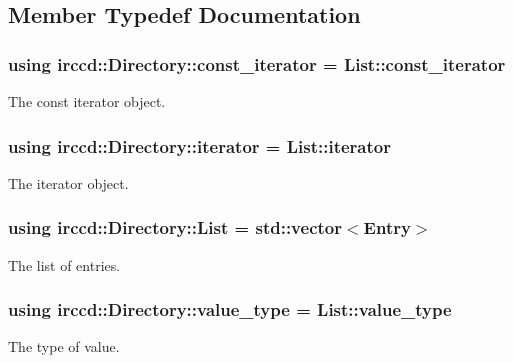 \subsection{Member Typedef Documentation}
\hypertarget{a00025_a191500fda5dd33a3ec8fee40abe7b0cd}{
\subsubsection[{const\-\_\-iterator}]{\setlength{\rightskip}{0pt plus 5cm}using {\bf irccd\-::\-Directory\-::const\-\_\-iterator} =  List\-::const\-\_\-iterator}}\label{a00025_a191500fda5dd33a3ec8fee40abe7b0cd}
The const iterator object. \hypertarget{a00025_a6749daedacaff39269675e482a067167}{
\subsubsection[{iterator}]{\setlength{\rightskip}{0pt plus 5cm}using {\bf irccd\-::\-Directory\-::iterator} =  List\-::iterator}}\label{a00025_a6749daedacaff39269675e482a067167}
The iterator object. \hypertarget{a00025_a375d63db514c30cf26eac6d664525604}{
\subsubsection[{List}]{\setlength{\rightskip}{0pt plus 5cm}using {\bf irccd\-::\-Directory\-::\-List} =  std\-::vector$<${\bf Entry}$>$}}\label{a00025_a375d63db514c30cf26eac6d664525604}
The list of entries. \hypertarget{a00025_ad110f19a9dd69c4051884a061308e7fa}{
\subsubsection[{value\-\_\-type}]{\setlength{\rightskip}{0pt plus 5cm}using {\bf irccd\-::\-Directory\-::value\-\_\-type} =  List\-::value\-\_\-type}}\label{a00025_ad110f19a9dd69c4051884a061308e7fa}
The type of value. 

